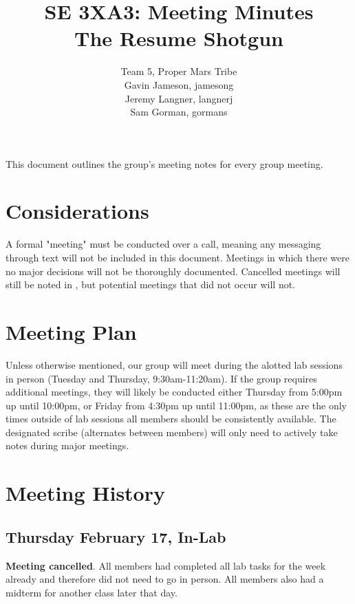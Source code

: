 \documentclass{article}
\title{SE 3XA3: Meeting Minutes\\The Resume Shotgun}
\author{Team 5, Proper Mars Tribe
		\\ Gavin Jameson, jamesong
		\\ Jeremy Langner, langnerj
		\\ Sam Gorman, gormans
}
\date{}
\begin{document}
\maketitle

\newpage

\tableofcontents

\newpage

This document outlines the group's meeting notes for every group meeting. 

\section{Considerations} \label{sec:considerations}

A formal "meeting" must be conducted over a call, meaning any messaging through text will not be included in this document. Meetings in which there were no major decisions will not be thoroughly documented. Cancelled meetings will still be noted in , but potential meetings that did not occur will not.

\section{Meeting Plan}

Unless otherwise mentioned, our group will meet during the alotted lab sessions in person (Tuesday and Thursday, 9:30am-11:20am). If the group requires additional meetings, they will likely be conducted either Thursday from 5:00pm up until 10:00pm, or Friday from 4:30pm up until 11:00pm, as these are the only times outside of lab sessions all members should be consistently available. The designated scribe (alternates between members) will only need to actively take notes during major meetings.

\section{Meeting History} \label{sec:history}

\subsection{Thursday February 17, In-Lab}

\textbf{Meeting cancelled}. All members had completed all lab tasks for the week already and therefore did not need to go in person. All members also had a midterm for another class later that day.
\end{document}
